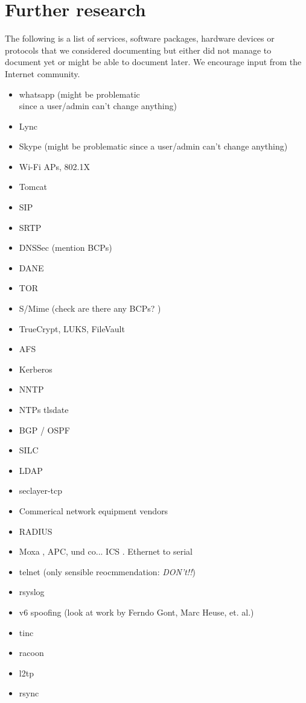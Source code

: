 \chapter{Further research}
\label{cha:further-research}
The following is a list of services, software packages, hardware devices or protocols that we considered documenting but either did not manage to document yet or might be able to document later. We encourage input from the Internet community. 

\begin{multicols}{3}
\begin{itemize}
\item whatsapp (might be problematic\\ since a user/admin can't change anything)
\item Lync
\item Skype (might be problematic since a user/admin can't change anything)
\item Wi-Fi APs, 802.1X
\item Tomcat
\item SIP 
\item SRTP 
\item DNSSec (mention BCPs) 
\item DANE
\item TOR 
\item S/Mime (check are there any BCPs? )
\item TrueCrypt, LUKS, FileVault
\item AFS 
\item Kerberos 
\item NNTP 
\item NTPs tlsdate 
\item BGP / OSPF 
\item SILC
\item LDAP
\item seclayer-tcp
\item Commerical network equipment vendors
\item RADIUS 
\item Moxa , APC, und co... ICS . Ethernet to serial 
\item telnet (only sensible reocmmendation: \emph{DON't!!})
\item rsyslog 
\item v6 spoofing (look at work by Ferndo Gont, Marc Heuse, et. al.)
\item tinc
\item racoon
\item l2tp
\item rsync 

\end{itemize}
\end{multicols}

